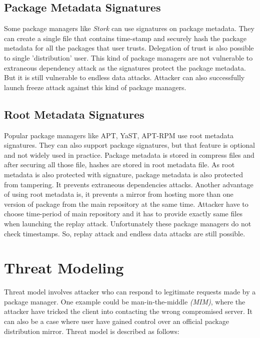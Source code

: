 \documentclass{IEEEtran}
\begin{document}
\subsection{Package Metadata Signatures}
\label{subsec:pkg-metadata-sign}
Some package managers like \emph{Stork} can use signatures on package metadata. They can create a single file that contains time-stamp and securely hash the package metadata for all the packages that user trusts. Delegation of trust is also possible to single 'distribution' user.
This kind of package managers are not vulnerable to extraneous dependency attack as the signatures protect the package metadata. But it is still vulnerable to endless data attacks. Attacker can also successfully launch freeze attack against this kind of package managers.

\subsection{Root Metadata Signatures}
\label{subsec:root-metadata-sign}
Popular package managers like APT, YaST, APT-RPM use root metadata signatures. They can also support package signatures, but that feature is optional and not widely used in practice. Package metadata is stored in compress files and after securing all those file, hashes are stored in root metadata file. As root metadata is also protected with signature, package metadata is also protected from tampering. It prevents extraneous dependencies attacks. Another advantage of using root metadata is, it prevents a mirror from hosting more than one version of package from the main repository at the same time. Attacker have to choose time-period of main repository and it has to provide exactly same files when launching the replay attack. Unfortunately these package managers do not check timestamps. So, replay attack and endless data attacks are still possible.


\section{Threat Modeling}
\label{sec:threat-modeling}
Threat model involves attacker who can respond to legitimate requests made by a package manager. One example could be man-in-the-middle \emph{(MIM)}, where the attacker have tricked the client into contacting the wrong compromised server. It can also be a case where user have gained control over an official package distribution mirror. Threat model is described as follows:
\end{document}
